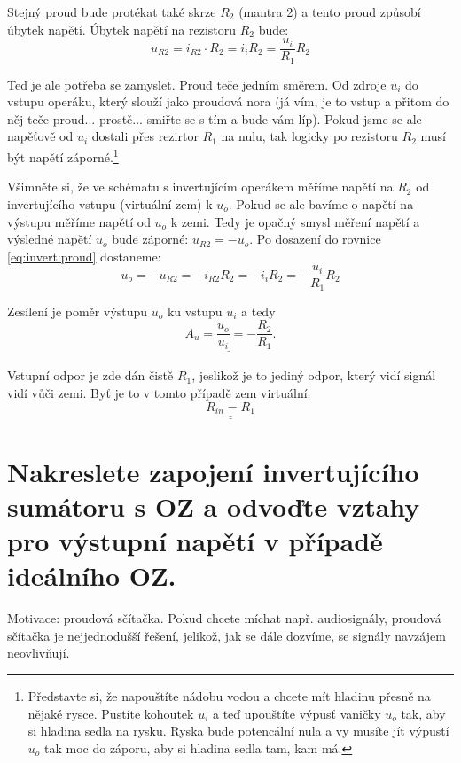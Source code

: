 \documentclass[a4paper,12pt]{article}   %
\begin{document}
Stejný proud bude protékat také skrze $R_2$ (mantra 2) a tento proud způsobí úbytek napětí. Úbytek napětí na rezistoru $R_2$ bude:
\begin{equation}
    u_{R2} = i_{R2}\cdot R_2 = i_i R_2 = \frac{u_i}{R_1} R_2
    \label{eq:invert:proud}
\end{equation}

Teď je ale potřeba se zamyslet. Proud teče jedním směrem. Od zdroje $u_i$ do vstupu operáku, který slouží jako proudová nora (já vím, je to vstup a přitom do něj teče proud... prostě... smiřte se s tím a bude vám líp). Pokud jsme se ale napěťově od $u_i$ dostali přes rezirtor $R_1$ na nulu, tak logicky po rezistoru $R_2$ musí být napětí záporné.\footnote{Představte si, že napouštíte nádobu vodou a chcete mít hladinu přesně na nějaké rysce. Pustíte kohoutek $u_i$ a teď upouštíte výpusť vaničky $u_o$ tak, aby si hladina sedla na rysku. Ryska bude potencální nula a vy musíte jít výpustí $u_o$ tak moc do záporu, aby si hladina sedla tam, kam má.}

Všimněte si, že ve schématu s invertujícím operákem měříme napětí na $R_2$ od invertujícího vstupu (virtuální zem) k $u_o$. Pokud se ale bavíme o napětí na výstupu měříme napětí od $u_o$ k zemi. Tedy je opačný smysl měření napětí a výsledné napětí $u_o$ bude záporné: $u_{R2} = -u_o$. Po dosazení do rovnice \eqref{eq:invert:proud} dostaneme:
\begin{equation*}
    u_o = -u_{R2} = -i_{R2}R_2 = -i_i R_2 = -\frac{u_i}{R_1}R_2
\end{equation*}

Zesílení je poměr výstupu $u_o$ ku vstupu $u_i$ a tedy
\begin{equation*}
    \underline{\underline{A_u = \frac{u_o}{u_i} = -\frac{R_2}{R_1}}}.
\end{equation*}



Vstupní odpor je zde dán čistě $R_1$, jeslikož je to jediný odpor, který vidí signál vidí vůči zemi. Byť je to v tomto případě zem virtuální.
\begin{equation*}
    \underline{\underline{R_{in} = R_1}}
\end{equation*}


\section{Nakreslete zapojení invertujícího sumátoru s OZ a odvoďte vztahy pro výstupní napětí v případě ideálního OZ.}
Motivace: proudová sčítačka. Pokud chcete míchat např. audiosignály, proudová sčítačka je nejjednodušší řešení, jelikož, jak se dále dozvíme, se signály navzájem neovlivňují.
\end{document}
